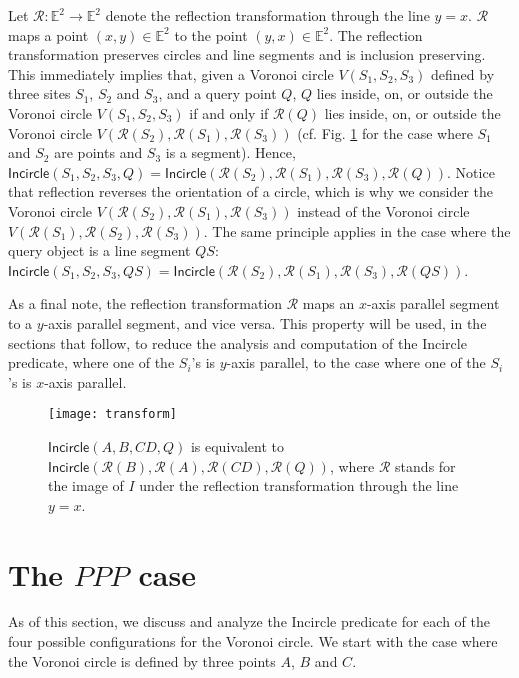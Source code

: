 \documentclass[letterpaper,11pt]{article}
\newcommand{\incircle}{\textsf{Incircle}\xspace}
\newcommand{\vor}{Voronoi\xspace}
\newcommand{\rfl}{\mathcal{R}\xspace}
\newcommand{\rfx}[1]{\mathcal{R}(#1)\xspace}
\newcommand{\EE}{\mathbb{E}\xspace}
\newcommand{\ppp}{$PPP$\xspace}
\begin{document}
Let $\rfl:\EE^2\rightarrow\EE^2$ denote the reflection transformation
through the line $y=x$. $\rfl$ maps a point $(x,y)\in\EE^2$ to the
point $(y,x)\in\EE^2$. 
The reflection transformation preserves circles and line segments and
is inclusion preserving. This immediately implies that, given a \vor
circle $V(S_1,S_2,S_3)$ defined by three sites $S_1$, $S_2$ and $S_3$,
and a query point $Q$, $Q$ lies inside, on, or outside the \vor circle
$V(S_1,S_2,S_3)$ if and only if $\rfx{Q}$ lies inside, on, or outside
the \vor circle $V(\rfx{S_2},\rfx{S_1},\rfx{S_3})$ (cf. Fig. 
\ref{fig:transform} for the case where $S_1$ and $S_2$ are points and
$S_3$ is a segment). Hence,
$\incircle(S_1,S_2,S_3,Q)=\incircle(\rfx{S_2},\rfx{S_1},\rfx{S_3},\rfx{Q})$.
Notice that reflection reverses the orientation of a circle, which is
why we consider the \vor circle $V(\rfx{S_2},\rfx{S_1},\rfx{S_3})$
instead of the \vor circle $V(\rfx{S_1},\rfx{S_2},\rfx{S_3})$.
The same principle applies in the case where the query object is a
line segment $QS$:
$\incircle(S_1,S_2,S_3,QS)=\incircle(\rfx{S_2},\rfx{S_1},\rfx{S_3},\rfx{QS})$.

As a final note, the reflection transformation $\rfl$ maps an $x$-axis
parallel segment to a $y$-axis parallel segment, and vice versa. This
property will be used, in the sections that follow, to reduce the
analysis and computation of the \incircle predicate, where one of the
$S_i$'s is $y$-axis parallel, to the case where one of the $S_i$'s is
$x$-axis parallel.


\begin{figure}[!h]
  \begin{center}
    \texttt{[image: transform]} 
  \end{center}
  \caption{$\incircle(A,B,CD,Q)$ is equivalent to
    $\incircle(\rfx{B},\rfx{A},\rfx{CD},\rfx{Q})$, where
    $\rfl$ stands for the image of $I$ under the reflection
    transformation through the line $y=x$.}
  \label{fig:transform}
\end{figure} 



\section{The \ppp case}\label{sec:ppp}

As of this section, we discuss and analyze the \incircle predicate for
each of the four possible configurations for the \vor circle. We start
with the case where the \vor circle is defined by three points $A$,
$B$ and $C$.
\end{document}
